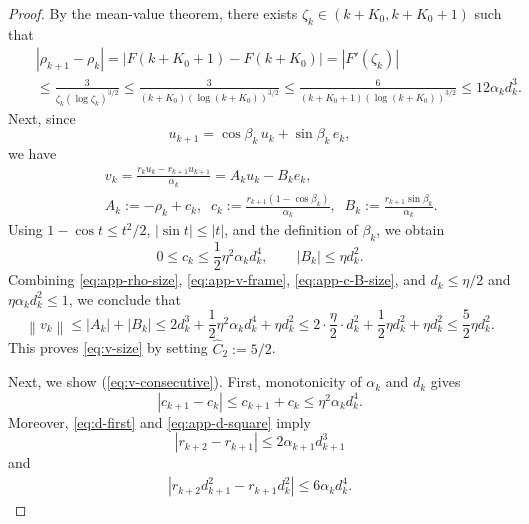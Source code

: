 \documentclass[10pt,a4paper]{amsart}
\newcommand{\nn}{\nonumber}
\newcommand{\norm}[1]{\left\lVert #1\right\rVert}
\begin{document}
\begin{proof}
By the mean-value theorem, there exists
$\zeta_k\in(k+K_0,k+K_0+1)$ such that
\begin{eqnarray*}
 &&|\rho_{k+1}-\rho_k|
 =|F(k+K_0+1)-F(k+K_0)|
 =|F'(\zeta_k)|\nn\\
 &&
 \leq
 \frac{3}{\zeta_k(\log \zeta_k)^{3/2}}\leq\frac{3}{(k+K_0)(\log (k+K_0))^{3/2}}\leq\frac{6}{(k+K_0+1)(\log (k+K_0))^{3/2}}
 \leq 12\alpha_k d_k^3.
\end{eqnarray*}
\noindent Next, since
\[
    u_{k+1}=\cos\beta_k\,u_k+\sin\beta_k\,e_k,
\]
we have
\begin{eqnarray}
    &&v_k=\frac{r_ku_k-r_{k+1}u_{k+1}}{\alpha_k}=A_ku_k-B_ke_k,\nn\\
    &&A_k:=-\rho_k+c_k,
    \;\;
    c_k:=\frac{r_{k+1}(1-\cos\beta_k)}{\alpha_k},
    \;\;
    B_k:=\frac{r_{k+1}\sin\beta_k}{\alpha_k}.
    \label{eq:app-v-frame}
\end{eqnarray}
%
Using \(1-\cos t\leq t^2/2\), \(|\sin t|\leq|t|\), and the definition of
\(\beta_k\), we obtain
\begin{equation}
    0\leq c_k\leq \frac{1}{2}\eta^2\alpha_kd_k^4,
    \qquad
    |B_k|\leq\eta d_k^2.
    \label{eq:app-c-B-size}
\end{equation}
Combining \eqref{eq:app-rho-size}, \eqref{eq:app-v-frame},
\eqref{eq:app-c-B-size}, and \(d_k\leq\eta/2\) and $\eta\alpha_k d_k^2\le 1$, we conclude that
\[
    \norm{v_k}
    \leq |A_k|+|B_k|
    \leq 2 d_k^3+\frac{1}{2}\eta^2 \alpha_k d_k^4 +\eta d_k^2
    \leq 2 \cdot\frac{\eta}{2}\cdot d_k^2+\frac{1}{2}\eta d_k^2+\eta d_k^2\le\frac{5}{2}\eta d_k^2.
\]
This proves \eqref{eq:v-size} by setting $\widehat C_2:=5/2$.

Next, we show (\ref{eq:v-consecutive}).
First, monotonicity of \(\alpha_k\) and \(d_k\) gives
\begin{equation}
    |c_{k+1}-c_k|
    \leq c_{k+1}+c_k
    \leq \eta^2\alpha_kd_k^4.
    \label{eq:app-c-difference}
\end{equation}
 Moreover,
\eqref{eq:d-first} and \eqref{eq:app-d-square} imply
\[
    |r_{k+2}-r_{k+1}|\leq 2 \alpha_{k+1}d_{k+1}^3
\]
and
\begin{eqnarray}\label{addkey}
    \left|
       r_{k+2}d_{k+1}^2-r_{k+1}d_k^2
    \right|
    \leq 6\alpha_kd_k^4.
\end{eqnarray}



\end{proof}
\end{document}
